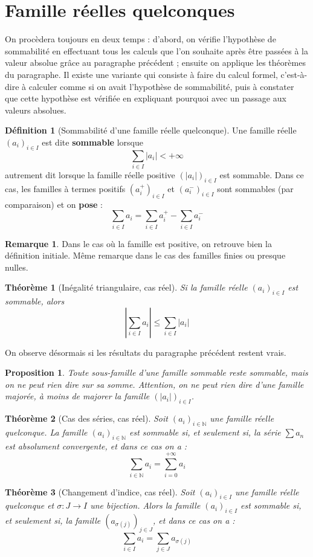 \documentclass[french]{book}
\newcommand{\N}{\mathbb{N}}
\theoremstyle{plain}
\newtheorem{thm}{Théorème}[chapter]
\newtheorem{prop}{Proposition}[chapter]
\theoremstyle{definition}
\newtheorem{dfn}{Définition}[chapter]
\newtheorem{rmq}{Remarque}[chapter]
\theoremstyle{remark}
\begin{document}
\section{Famille réelles quelconques}
On procèdera toujours en deux temps : d'abord, on vérifie l'hypothèse de sommabilité en effectuant tous les calculs que l'on souhaite après être passées à la valeur absolue grâce au paragraphe précédent ; ensuite on applique les théorèmes du paragraphe. Il existe une variante qui consiste à faire du calcul formel, c'est-à-dire à calculer comme si on avait l'hypothèse de sommabilité, puis à constater que cette hypothèse est vérifiée en expliquant pourquoi avec un passage aux valeurs absolues.
\begin{dfn}[Sommabilité d'une famille réelle quelconque]
	Une famille réelle $(a_i)_{i\in I}$ est dite \textbf{sommable} lorsque $$\sum_{i\in I}\lvert a_i\rvert <+\infty$$autrement dit lorsque la famille réelle positive $(\lvert a_i\rvert)_{i\in I}$ est sommable. Dans ce cas, les familles à termes positifs $(a_i^+)_{i\in I}$ et $(a_i^-)_{i\in I}$ sont sommables (par comparaison) et on \textbf{pose} : $$\sum_{i\in I}a_i=\sum_{i\in I}a_i^+ - \sum_{i\in I}a_i^-$$
\end{dfn}
\begin{rmq} Dans le cas où la famille est positive, on retrouve bien la définition initiale. Même remarque dans le cas des familles finies ou presque nulles. \end{rmq}
\begin{thm}[Inégalité triangulaire, cas réel]
	Si la famille réelle $(a_i)_{i\in I}$ est sommable, alors $$\left\lvert\sum_{i\in I}a_i\right\rvert \leqslant\sum_{i\in I}\lvert a_i\rvert$$
\end{thm}
On observe désormais si les résultats du paragraphe précédent restent vrais.
\begin{prop}
	Toute sous-famille d'une famille sommable reste sommable, mais on ne peut rien dire sur sa somme. Attention, on ne peut rien dire d'une famille majorée, à moins de majorer la famille $(\lvert a_i\rvert)_{i\in I}$.
\end{prop}
\begin{thm}[Cas des séries, cas réel]
	Soit $(a_i)_{i\in\N}$ une famille réelle quelconque. La famille $(a_i)_{i\in\N}$ est sommable si, et seulement si, la série $\displaystyle \sum a_n$ est absolument convergente, et dans ce cas on a : $$\sum_{i\in\N}a_i=\sum_{i=0}^{+\infty}a_i$$
\end{thm}
\begin{thm}[Changement d'indice, cas réel]
	Soit $(a_i)_{i\in I}$ une famille réelle quelconque et $\sigma:J\rightarrow I$ une bijection. Alors la famille $(a_i)_{i\in I}$ est sommable si, et seulement si, la famille $(a_{\sigma(j)})_{j\in J}$, et dans ce cas on a : $$\sum_{i\in I}a_i=\sum_{j\in J}a_{\sigma(j)}$$
\end{thm}
\end{document}
